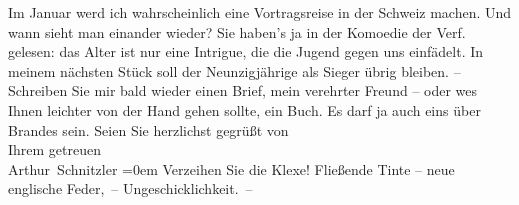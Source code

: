 \begin{ledgroupsized}[t]{13cm}
           \pstart
           Im Januar werd ich wahrscheinlich eine Vortragsreise in der Schweiz machen. Und wann sieht man einander
               wieder? Sie haben's ja in der Komoedie der Verf.
               gelesen: das Alter ist nur eine Intrigue, die die Jugend gegen uns einfädelt. In
               meinem nächsten Stück soll der
               Neunzigjährige als Sieger übrig bleiben.\pend
           \pstart
           {\pb}– Schreiben Sie mir bald wieder einen Brief, mein
               verehrter Freund – oder we{\geminationn}s Ihnen leichter von der Hand
               gehen sollte, ein Buch. Es darf ja auch eins über Brandes sein.\pend
           \pstart
           Seien Sie herzlichst gegrüßt von{\\[\baselineskip]}Ihrem getreuen{\\[\baselineskip]}\spacefill\mbox{Arthur Schnitzler}\pend
           \leftskip=0em{}\pstart
           \noindent{}Verzeihen Sie die Klexe! Fließende Tinte – neue englische Feder, – Ungeschicklichkeit. –\pend
           
         
         \endnumbering{}\end{ledgroupsized}  \newcommand{\dateiname}{L02423}\newcommand{\titel}{Arthur Schnitzler an Georg Brandes, 14. 12. 1924}\newcommand{\editorInnen}{Martin Anton Müller und Gerd-Hermann Susen}
      